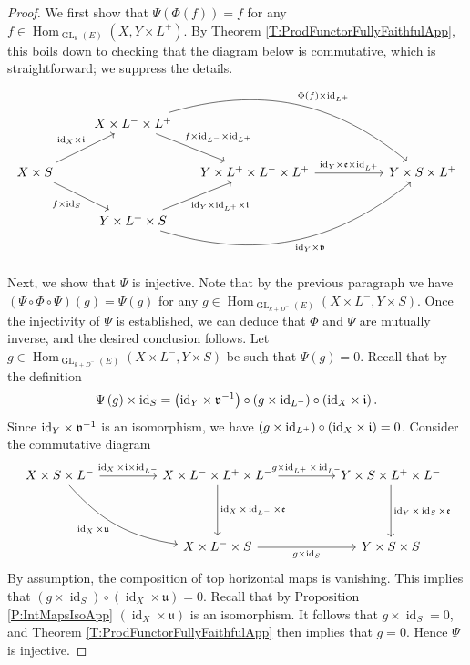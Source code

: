 \documentclass[11pt,letterpaper]{amsart}
\theoremstyle{plain}
\numberwithin{theorem}{section}
\numberwithin{equation}{subsection}
\theoremstyle{remark}
\newcommand{\Hom}{\operatorname{Hom}}
\newcommand{\GL}{\operatorname{GL}}
\newcommand{\id}{\operatorname{id}}
\begin{document}
\begin{proof}
We first show that $\Psi\left(\Phi\left(f\right)\right)=f$ for any $f\in\Hom_{\GL_k\left(E\right)}\left(X,Y\times L^+\right)$. By Theorem \ref{T:ProdFunctorFullyFaithfulApp}, this boils down to checking that the diagram below is commutative, which is straightforward; we suppress the details.
\[
\begin{tikzcd}[row sep=2.2em]
  & {X\times L^-\times L^+} 
    \arrow[dr, "{f\times\mathrm{id}_{L^-}\times\mathrm{id}_{L^+}}"{pos=0.38, inner sep=1.5pt}] 
    \arrow[drr, "{\Phi(f)\times\mathrm{id}_{L^+}}", bend left=28] 
  &[-1em] &[3em] \\
{X\times S} 
  \arrow[ur, "{\mathrm{id}_X\times \mathfrak{i}}"{pos=0.55}] 
  \arrow[dr, "{f\times \mathrm{id}_S}"'{pos=0.55}] 
  & & {Y\times L^+\times L^-\times L^+} 
    \arrow[r, "{\mathrm{id}_Y\times\mathfrak{e}\times\mathrm{id}_{L^+}}"] 
  & {Y\times S\times L^+} \\
  & {Y\times L^+\times S} 
    \arrow[ur, "{\mathrm{id}_Y\times\mathrm{id}_{L^+}\times\mathfrak{i}}"'{pos=0.38, inner sep=1.5pt}] 
    \arrow[urr, "{\mathrm{id}_Y\times \mathfrak{v}}"', bend right=28] 
  & &
\end{tikzcd}
\]

\vskip 5pt

Next, we show that $\Psi$ is injective. Note that by the previous paragraph we have $\left(\Psi\circ\Phi\circ\Psi\right)\left(g\right)=\Psi\left(g\right)$ for any $g\in\Hom_{\GL_{k+D^-}\left(E\right)}\left(X\times L^-,Y\times S\right)$. Once the injectivity of $\Psi$ is established, we can deduce that $\Phi$ and $\Psi$ are mutually inverse, and the desired conclusion follows. Let $g\in\Hom_{\GL_{k+D^-}\left(E\right)}\left(X\times L^-,Y\times S\right)$ be such that $\Psi\left(g\right)=0$. Recall that by the definition
\[
    \Psi\left(g\right)\times\id_S = \left({\rm id}_Y\times \mathfrak{v}^{-1}\right)\circ\left(g\times{\rm id}_{L^+}\right)\circ\left({\rm id}_X\times\mathfrak{i}\right).
\]
Since ${\rm id}_Y\times \mathfrak{v}^{-1}$ is an isomorphism, we have $\left(g\times{\rm id}_{L^+}\right)\circ\left({\rm id}_X\times\mathfrak{i}\right)=0$. Consider the commutative diagram
\[
\begin{tikzcd}[row sep=4.0em, column sep=4.5em]
{X\times S\times L^-} 
  \arrow[r, "{\id_X\times\mathfrak{i}\times\id_{L^-}}"] 
  \arrow[dr, "{\id_X\times\mathfrak{u}}"'{pos=0.45}, bend right=20] 
& {X\times L^-\times L^+\times L^-} 
  \arrow[r, "{g\times \id_{L^+}\times\id_{L^-}}"] 
  \arrow[d, "{\id_X\times\id_{L^-}\times\mathfrak{e}}"] 
& {Y\times S\times L^+\times L^-} 
  \arrow[d, "{\id_Y\times\id_S\times\mathfrak{e}}"] \\
& {X\times L^-\times S} 
  \arrow[r, "{g\times\id_S}"'] 
& {Y\times S\times S}
\end{tikzcd}
\]
By assumption, the composition of top horizontal maps is vanishing. This implies that $\left(g\times\id_S\right)\circ\left(\id_X\times \mathfrak{u}\right)=0$. Recall that by Proposition \ref{P:IntMapsIsoApp} $\left(\id_X\times \mathfrak{u}\right)$ is an isomorphism. It follows that $g\times\id_S=0$, and Theorem \ref{T:ProdFunctorFullyFaithfulApp} then implies that $g=0$. Hence $\Psi$ is injective.


\end{proof}
\end{document}
